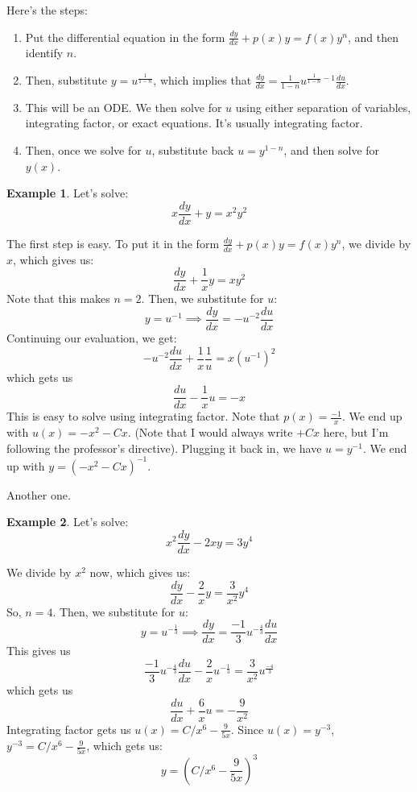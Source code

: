 \documentclass{article}
\theoremstyle{definition}
\newtheorem{example}{Example}[section]
\begin{document}
Here's the steps:
\begin{enumerate}
    \item Put the differential equation in the form $\frac{dy}{dx} + p(x)y = f(x)y^n$, and then identify $n$.
    \item Then, substitute $y = u^\frac{1}{1-n}$, which implies that $\frac{dy}{dx}=\frac{1}{1-n}u^{\frac{1}{1-n}-1}\frac{du}{dx}$.
    \item This will be an ODE. We then solve for $u$ using either separation of variables, integrating factor, or exact equations. It's usually integrating factor. 
    \item Then, once we solve for $u$, substitute back $u = y^{1-n}$, and then solve for $y(x)$. 
\end{enumerate}
\begin{example}
    Let's solve:
    \[ 
    x\frac{dy}{dx} + y = x^2y^2
    \]

    The first step is easy. To put it in the form $\frac{dy}{dx} + p(x)y = f(x)y^n$, we divide by $x$, which gives us:
    \[
    \frac{dy}{dx} + \frac{1}{x}y = xy^2
    \]
    Note that this makes $n=2$. Then, we substitute for $u$:
    \[ 
    y = u^{-1} \implies \frac{dy}{dx} = -u^{-2}\frac{du}{dx}
    \]
    Continuing our evaluation, we get:
    \[
    -u^{-2}\frac{du}{dx} + \frac{1}{x}\frac{1}{u} = x(u^{-1})^2
    \]
    which gets us
    \[\frac{du}{dx} - \frac{1}{x}u = -x \]
    This is easy to solve using integrating factor. Note that $p(x) = \frac{-1}{x}$. We end up with $u(x) = -x^2 - Cx$. (Note that I would always write $+Cx$ here, but I'm following the professor's directive).
    Plugging it back in, we have $u = y^{-1}$. We end up with $y = ({-x^2-Cx})^{-1}$.
\end{example}
Another one.
\begin{example}
    Let's solve:
    \[ 
    x^2\frac{dy}{dx} - 2xy = 3y^4
    \]

    We divide by $x^2$ now, which gives us:
    \[
    \frac{dy}{dx} - \frac{2}{x}y = \frac{3}{x^2}y^4
    \]
    So, $n=4$. Then, we substitute for $u$:
    \[ 
    y = u^{-\frac{1}{3}} \implies \frac{dy}{dx} = \frac{-1}{3}u^{-\frac{4}{3}}\frac{du}{dx}
    \]
    This gives us
    \[
    \frac{-1}{3}u^{-\frac{4}{3}}\frac{du}{dx} - \frac{2}{x}u^{-\frac{1}{3}} = \frac{3}{x^2}u^\frac{-4}{3}
    \]
    which gets us
    \[\frac{du}{dx} + \frac{6}{x}u = -\frac{9}{x^2} \]
    Integrating factor gets us $u(x) = C/x^6 - \frac{9}{5x}$. Since $u(x) = y^{-3}$, $y^{-3} = C/x^6 - \frac{9}{5x}$, which gets us:
    \[ 
    y = (C/x^6 - \frac{9}{5x})^3
    \]
\end{example}
\end{document}
